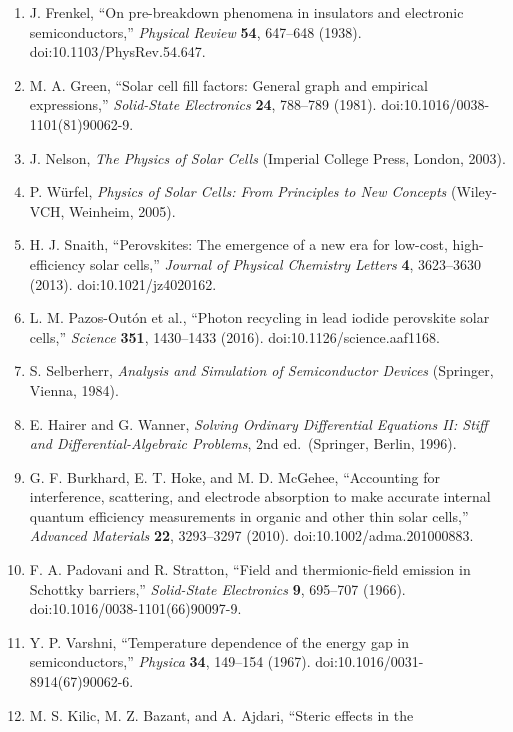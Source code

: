 \documentclass[
  11pt,
  american,
]{report}
\begin{document}
\begin{enumerate}
  empirically related to doping and field,'' \emph{Proceedings of the
  IEEE} \textbf{55}, 2192--2193 (1967). doi:10.1109/PROC.1967.6123.
\item
  J. Frenkel, ``On pre-breakdown phenomena in insulators and electronic
  semiconductors,'' \emph{Physical Review} \textbf{54}, 647--648 (1938).
  doi:10.1103/PhysRev.54.647.
\item
  M. A. Green, ``Solar cell fill factors: General graph and empirical
  expressions,'' \emph{Solid-State Electronics} \textbf{24}, 788--789
  (1981). doi:10.1016/0038-1101(81)90062-9.
\item
  J. Nelson, \emph{The Physics of Solar Cells} (Imperial College Press,
  London, 2003).
\item
  P. Würfel, \emph{Physics of Solar Cells: From Principles to New
  Concepts} (Wiley-VCH, Weinheim, 2005).
\item
  H. J. Snaith, ``Perovskites: The emergence of a new era for low-cost,
  high-efficiency solar cells,'' \emph{Journal of Physical Chemistry
  Letters} \textbf{4}, 3623--3630 (2013). doi:10.1021/jz4020162.
\item
  L. M. Pazos-Outón et al., ``Photon recycling in lead iodide perovskite
  solar cells,'' \emph{Science} \textbf{351}, 1430--1433 (2016).
  doi:10.1126/science.aaf1168.
\item
  S. Selberherr, \emph{Analysis and Simulation of Semiconductor Devices}
  (Springer, Vienna, 1984).
\item
  E. Hairer and G. Wanner, \emph{Solving Ordinary Differential Equations
  II: Stiff and Differential-Algebraic Problems}, 2nd ed.~(Springer,
  Berlin, 1996).
\item
  G. F. Burkhard, E. T. Hoke, and M. D. McGehee, ``Accounting for
  interference, scattering, and electrode absorption to make accurate
  internal quantum efficiency measurements in organic and other thin
  solar cells,'' \emph{Advanced Materials} \textbf{22}, 3293--3297
  (2010). doi:10.1002/adma.201000883.
\item
  F. A. Padovani and R. Stratton, ``Field and thermionic-field emission
  in Schottky barriers,'' \emph{Solid-State Electronics} \textbf{9},
  695--707 (1966). doi:10.1016/0038-1101(66)90097-9.
\item
  Y. P. Varshni, ``Temperature dependence of the energy gap in
  semiconductors,'' \emph{Physica} \textbf{34}, 149--154 (1967).
  doi:10.1016/0031-8914(67)90062-6.
\item
  M. S. Kilic, M. Z. Bazant, and A. Ajdari, ``Steric effects in the

\end{enumerate}
\end{document}
